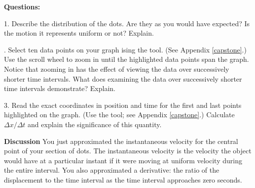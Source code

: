 \medskip

{\noindent \bf Questions:}

1. Describe the distribution of the dots. Are they as you would have expected?
Is the motion it represents uniform or not? Explain. 
\answerspace{20mm}

. Select ten data points on your graph ising the  tool. (See Appendix \ref{capstone}.) 
Use the scroll wheel to zoom in until the highlighted data points span the graph.
Notice that zooming in has the effect of viewing the data over successively
shorter time intervals. What does examining the data over successively shorter
time intervals demonstrate? Explain.
\answerspace{20mm}

3. Read the exact coordinates in position and time
for the first and last points highlighted on the graph. (Use the  tool; see Appendix \ref{capstone}.)  Calculate \( \Delta x/\Delta t \)
and explain the significance of this quantity.
\answerspace{20mm}

{\noindent \bf Discussion} You just approximated the instantaneous velocity for the central point of your section of dots. The instantaneous velocity is the velocity the object would have at a particular instant if it were moving at uniform velocity during the entire interval. You also approximated a derivative: the ratio of the displacement to the time interval as the time interval approaches zero seconds. 

